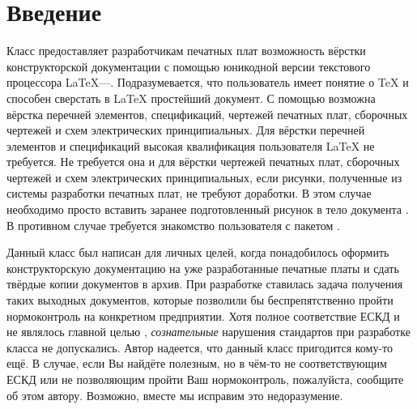 
\section{Введение}

Класс  предоставляет разработчикам печатных плат возможность
вёрстки конструкторской документации с помощью юникодной версии текстового
процессора \LaTeX{}---\XeLaTeX{}. Подразумевается, что пользователь
имеет понятие о \TeX{} и способен сверстать в \LaTeX{} простейший
документ. С помощью  возможна вёрстка перечней элементов,
спецификаций, чертежей печатных плат, сборочных чертежей и схем электрических
принципиальных. Для вёрстки перечней элементов и спецификаций высокая
квалификация пользователя \LaTeX{} не требуется. Не требуется она и для
вёрстки чертежей печатных плат, сборочных чертежей и схем электрических
принципиальных, если рисунки, полученные из системы разработки печатных плат, не
требуют доработки. В этом случае необходимо просто вставить заранее
подготовленный рисунок в тело документа . В противном случае
требуется знакомство пользователя с пакетом .

Данный класс был написан для личных целей, когда понадобилось оформить
конструкторскую документацию на уже разработанные печатные платы и сдать твёрдые
копии документов в архив. При разработке  ставилась задача
получения таких выходных документов, которые позволили бы беспрепятственно
пройти нормоконтроль на конкретном предприятии. Хотя полное соответствие ЕСКД и
не являлось главной целью , \emph{сознательные} нарушения
стандартов при разработке класса не допускались. Автор надеется, что данный
класс пригодится кому-то ещё. В случае, если Вы найдёте 
полезным, но в чём-то не соответствующим ЕСКД или не позволяющим пройти Ваш
нормоконтроль, пожалуйста, сообщите об этом автору. Возможно, вместе мы исправим
это недоразумение.

